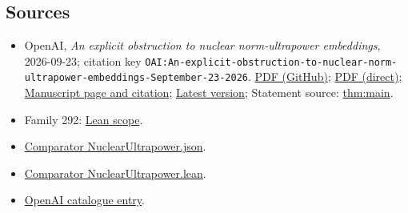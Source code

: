 \documentclass[11pt]{article}
\begin{document}
\subsection{Sources}
\begin{itemize}
\item OpenAI, \emph{An explicit obstruction to nuclear norm-ultrapower embeddings}, 2026-09-23; citation key \texttt{OAI:An-explicit-obstruction-to-nuclear-norm-ultrapower-embeddings-September-23-2026}. \href{https://github.com/openai/math/blob/adc7f1241b42e322a6451854ab7e4b4c146bf78a/preprints/An-explicit-obstruction-to-nuclear-norm-ultrapower-embeddings-September-23-2026/paper.pdf}{PDF (GitHub)}; \href{https://github.com/openai/math/raw/adc7f1241b42e322a6451854ab7e4b4c146bf78a/preprints/An-explicit-obstruction-to-nuclear-norm-ultrapower-embeddings-September-23-2026/paper.pdf}{PDF (direct)}; \href{https://github.com/openai/math/blob/adc7f1241b42e322a6451854ab7e4b4c146bf78a/preprints/An-explicit-obstruction-to-nuclear-norm-ultrapower-embeddings-September-23-2026/README.md}{Manuscript page and citation}; \href{https://github.com/openai/math/blob/main/preprints/An-explicit-obstruction-to-nuclear-norm-ultrapower-embeddings-September-23-2026/paper.pdf}{Latest version}; Statement source: \href{https://github.com/openai/math/blob/adc7f1241b42e322a6451854ab7e4b4c146bf78a/preprints/An-explicit-obstruction-to-nuclear-norm-ultrapower-embeddings-September-23-2026/build/introduction.tex\#L36}{thm:main}.
\item Family 292: \href{https://github.com/openai/math/blob/adc7f1241b42e322a6451854ab7e4b4c146bf78a/lean/docs/292.md}{Lean scope}.
\item \href{https://github.com/openai/math/blob/adc7f1241b42e322a6451854ab7e4b4c146bf78a/lean/ComparatorChallenges/NuclearUltrapower.json}{Comparator NuclearUltrapower.json}.
\item \href{https://github.com/openai/math/blob/adc7f1241b42e322a6451854ab7e4b4c146bf78a/lean/ComparatorChallenges/NuclearUltrapower.lean}{Comparator NuclearUltrapower.lean}.
\item \href{https://github.com/openai/math/blob/adc7f1241b42e322a6451854ab7e4b4c146bf78a/CONTENTS.md}{OpenAI catalogue entry}.
\end{itemize}
\end{document}
